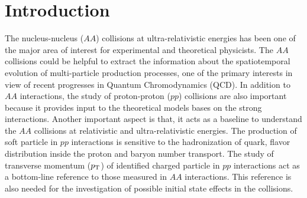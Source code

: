 \documentclass{article}
\newcommand{\sqrts}{\mbox{$\sqrt{\mathrm{s}}$}}
\newcommand{\ppt}{$p_{\rm T}$}
\begin{document}

\section{Introduction}\label{sec1}


The nucleus-nucleus ($AA$) collisions at ultra-relativistic energies has been one of the major area of interest for experimental and theoretical physicists. The $AA$ collisions could be helpful to extract the information about the spatiotemporal evolution of multi-particle production processes, one of the primary interests in view of recent progresses in Quantum Chromodynamics (QCD). In addition to $AA$ interactions, the study of proton-proton ($pp$) collisions are also important because it provides input to the theoretical models bases on the strong interactions. Another important aspect is that, it acts as a baseline to understand the $AA$ collisions at relativistic and ultra-relativistic energies. The production of soft particle in $pp$ interactions is sensitive to the hadronization of quark, flavor distribution inside the proton and baryon number transport. The study of transverse momentum ({\ppt}) of identified charged particle in $pp$ interactions act as a bottom-line reference to those measured in $AA$ interactions. This reference is also needed for the investigation of possible initial state effects in the collisions.    
\end{document}

